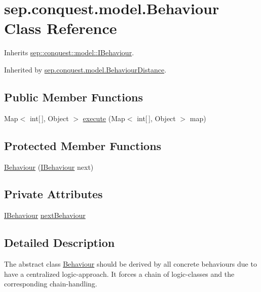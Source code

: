 \hypertarget{classsep_1_1conquest_1_1model_1_1_behaviour}{
\section{sep.conquest.model.Behaviour Class Reference}
\label{classsep_1_1conquest_1_1model_1_1_behaviour}
}


Inherits \hyperlink{interfacesep_1_1conquest_1_1model_1_1_i_behaviour}{sep::conquest::model::IBehaviour}.



Inherited by \hyperlink{classsep_1_1conquest_1_1model_1_1_behaviour_distance}{sep.conquest.model.BehaviourDistance}.

\subsection*{Public Member Functions}
\begin{DoxyCompactItemize}
\item 
Map$<$ int\mbox{[}$\,$\mbox{]}, Object $>$ \hyperlink{classsep_1_1conquest_1_1model_1_1_behaviour_abaf1df42c90d2c78dd4bd17a63d89374}{execute} (Map$<$ int\mbox{[}$\,$\mbox{]}, Object $>$ map)
\end{DoxyCompactItemize}
\subsection*{Protected Member Functions}
\begin{DoxyCompactItemize}
\item 
\hyperlink{classsep_1_1conquest_1_1model_1_1_behaviour_a7c09e27bdc85b4afae629075ef789639}{Behaviour} (\hyperlink{interfacesep_1_1conquest_1_1model_1_1_i_behaviour}{IBehaviour} next)
\end{DoxyCompactItemize}
\subsection*{Private Attributes}
\begin{DoxyCompactItemize}
\item 
\hyperlink{interfacesep_1_1conquest_1_1model_1_1_i_behaviour}{IBehaviour} \hyperlink{classsep_1_1conquest_1_1model_1_1_behaviour_aa5c8b900275f3c9403784f10a89e50f3}{nextBehaviour}
\end{DoxyCompactItemize}


\subsection{Detailed Description}
The abstract class \hyperlink{classsep_1_1conquest_1_1model_1_1_behaviour}{Behaviour} should be derived by all concrete behaviours due to have a centralized logic-\/approach. It forces a chain of logic-\/classes and the corresponding chain-\/handling.

